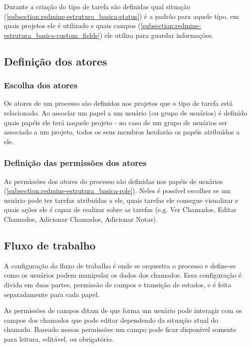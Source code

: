 Durante a criação do tipo de tarefa são definidas qual situação (\ref{subsection:redmine-estrutura_basica-status}) é a padrão para aquele tipo, em quais projetos ele é utilizado e quais campos (\ref{subsection:redmine-estrutura_basica-custom_fields}) ele utiliza para guardar informações.


\subsection{Definição dos atores}\label{subsection:redmine-automatizar_processo-atores}

\subsubsection{Escolha dos atores}

Os atores de um processo são definidos nos projetos que o tipo de tarefa está relacionado. Ao associar um papel a um usuário (ou grupo de usuários) é definido quais papéis ele terá naquele projeto - no caso de um grupo de usuários ser associado a um projeto, todos os seus membros herdarão os papéis atribuídos a ele.

\subsubsection{Definição das permissões dos atores}

As permissões dos atores do processo são definidas nos papéis de usuários (\ref{subsection:redmine-estrutura_basica-role}). Neles é possível escolher se um usuário pode ter tarefas atribuídas a ele, quais tarefas ele consegue visualizar e quais ações ele é capaz de realizar sobre as tarefas (e.g. Ver Chamados, Editar Chamados, Adicionar Chamados, Adicionar Notas).

\subsection{Fluxo de trabalho}

A configuração do fluxo de trabalho é onde se orquestra o processo e define-se como os usuários podem manipular os dados dos chamados. Essa configuração é divida em duas partes, permissão de campos e transição de estados, e é feita separadamente para cada papel.

As permissões de campos ditam de que forma um usuário pode interagir com os campos dos chamados que pode editar dependendo da situação atual do chamado. Baseado nessas permissões um campo pode ficar disponível somente para leitura, editável, ou obrigatório.

